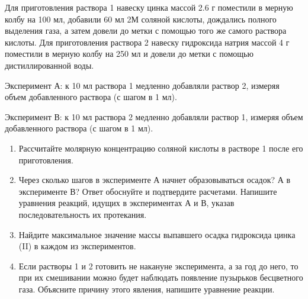 
Для приготовления раствора 1 навеску цинка массой 2.6 г поместили в мерную колбу на 100 мл, добавили 60 мл 2М 
соляной кислоты, дождались полного выделения газа, а затем довели до метки с помощью того же самого раствора 
кислоты. Для приготовления раствора 2 навеску гидроксида натрия массой 4 г поместили в мерную колбу на 250 мл и 
довели до метки с помощью дистиллированной воды. 

Эксперимент А: к 10 мл раствора 1 медленно добавляли раствор 2, измеряя объем добавленного раствора 
(с шагом в 1 мл).

Эксперимент В: к 10 мл раствора 2 медленно добавляли раствор 1, измеряя объем добавленного раствора 
(с шагом в 1 мл).

\begin{enumerate}
    \item Рассчитайте молярную концентрацию соляной кислоты в растворе 1 после его приготовления.
    \item Через сколько шагов в эксперименте А начнет образовываться осадок? А в эксперименте В? Ответ 
    обоснуйте и подтвердите расчетами. Напишите уравнения реакций, идущих в экспериментах А и В, указав 
    последовательность их протекания.
    \item Найдите максимальное значение массы выпавшего осадка гидроксида цинка (II) в каждом из экспериментов.
    \item Если растворы 1 и 2 готовить не накануне эксперимента, а за год до него, то при их смешивании можно 
    будет наблюдать появление пузырьков бесцветного газа. Объясните причину этого явления, напишите уравнение 
    реакции.
\end{enumerate}